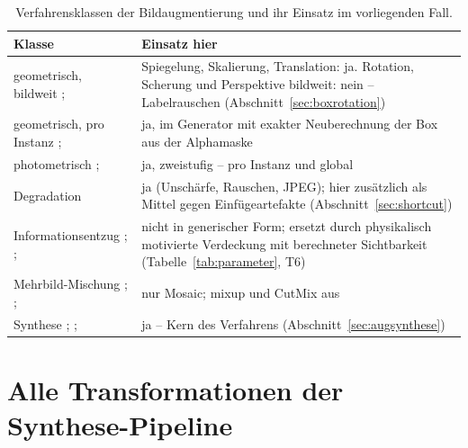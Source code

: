 \begin{table}[htbp]
\centering
\caption[Verfahrensklassen der Bildaugmentierung]{Verfahrensklassen der
Bildaugmentierung und ihr Einsatz im vorliegenden Fall.}
\label{tab:taxonomie}
\footnotesize
\begin{tabularx}{\textwidth}{@{}L{0.19\textwidth}X@{}}
\toprule
\textbf{Klasse} & \textbf{Einsatz hier} \\
\midrule
geometrisch, bildweit \newline
\scriptsize\cite{krizhevsky2012}; \cite{simard2003} &
Spiegelung, Skalierung, Translation: ja. Rotation, Scherung und Perspektive
bildweit: nein -- Labelrauschen (Abschnitt~\ref{sec:boxrotation}) \\
\addlinespace
geometrisch, pro Instanz \newline
\scriptsize\cite{dwibedi2017}; \cite{ghiasi2021} &
ja, im Generator mit exakter Neuberechnung der Box aus der Alphamaske \\
\addlinespace
photometrisch \newline
\scriptsize\cite{krizhevsky2012}; \cite{grossberg2003} &
ja, zweistufig -- pro Instanz und global \\
\addlinespace
Degradation \newline
\scriptsize\cite{hendrycks2019} &
ja (Unschärfe, Rauschen, JPEG); hier zusätzlich als Mittel gegen
Einfügeartefakte (Abschnitt~\ref{sec:shortcut}) \\
\addlinespace
Informationsentzug \newline
\scriptsize\cite{devries2017cutout}; \cite{zhong2020erasing};
\cite{singh2017hideseek} &
nicht in generischer Form; ersetzt durch physikalisch motivierte Verdeckung mit
berechneter Sichtbarkeit (Tabelle~\ref{tab:parameter}, T6) \\
\addlinespace
Mehrbild-Mischung \newline
\scriptsize\cite{zhang2018mixup}; \cite{yun2019cutmix}; \cite{bochkovskiy2020} &
nur Mosaic; mixup und CutMix aus \\
\addlinespace
Synthese \newline
\scriptsize\cite{dvornik2018}; \cite{tobin2017}; \cite{tremblay2018} &
ja -- Kern des Verfahrens (Abschnitt~\ref{sec:augsynthese}) \\
\bottomrule
\end{tabularx}
\end{table}

\section{Alle Transformationen der Synthese-Pipeline}

